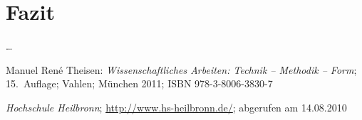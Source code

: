 \documentclass[12pt,toc=bib,toc=listof]{scrreprt}
\begin{document}
\chapter{Fazit} %
\label{sec:fazit}

\ldots


\appendix
\begin{thebibliography}{99}
\raggedright
 Manuel René Theisen:
 \emph{Wissenschaftliches Arbeiten: Technik -- Methodik -- Form};
 15.~Auflage; Vahlen; München 2011;
 ISBN 978-3-8006-3830-7

 \emph{Hochschule Heilbronn};
 \url{http://www.hs-heilbronn.de/};
 abgerufen am 14.08.2010
\end{thebibliography}
\end{document}
